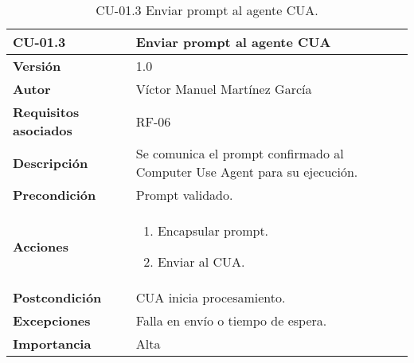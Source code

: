\begin{table}[p]
    \centering
    \begin{tabularx}{\linewidth}{ p{} p{} }
        \toprule
        \textbf{CU-01.3}    & \textbf{Enviar prompt al agente CUA}\\
        \toprule
        \textbf{Versión}              & 1.0 \\
        \textbf{Autor}                & Víctor Manuel Martínez García \\
        \textbf{Requisitos asociados} & RF-06 \\
        \textbf{Descripción}          & Se comunica el prompt confirmado al Computer Use Agent para su ejecución.\\
        \textbf{Precondición}         & Prompt validado.\\
        \textbf{Acciones}             &
        \begin{enumerate}
          \item Encapsular prompt.
          \item Enviar al CUA.
        \end{enumerate}\\
        \textbf{Postcondición}        & CUA inicia procesamiento.\\
        \textbf{Excepciones}          & Falla en envío o tiempo de espera.\\
        \textbf{Importancia}          & Alta \\
        \bottomrule
    \end{tabularx}
    \caption{CU-01.3 Enviar prompt al agente CUA.}
    \label{CU-01.3 Enviar prompt al agente CUA}
\end{table}

    


